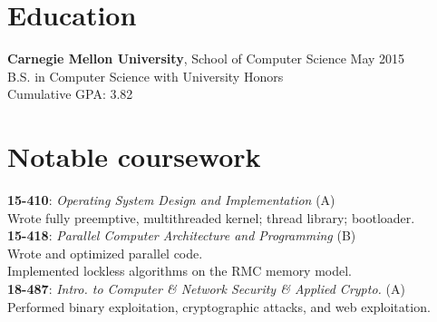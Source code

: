 \documentclass[margin]{res}
\newcommand{\course}[4]{ %
    \textbf{#1}: \textit{#2} (#4)\\
      #3
      \vspace{1em}
    \\}
\begin{document}

\address{
  \href{mailto:joshz@joshz.org}{joshz@joshz.org} \\
  (302) 468-7537
}
\address{  %
  \hfill \href{http://joshz.org}{http://joshz.org} \\
  \hfill
    \href{https://github.com/joshzimmerman}{https://github.com/joshzimmerman}
}

\begin{resume}

\section{Education}
  \textbf{Carnegie Mellon University}, School of Computer Science
    \hfill May 2015\\
  B.S. in Computer Science with University Honors\\
  Cumulative GPA: 3.82

\section{Notable coursework}
 \course{15-410}{Operating System Design and Implementation}
 {Wrote fully preemptive, multithreaded kernel; thread library; bootloader.}{A}
 \course{15-418}{Parallel Computer Architecture and Programming}
  {Wrote and optimized parallel code. \\
  Implemented lockless algorithms on the RMC memory model.}{B}
  \course{18-487}{Intro. to Computer \& Network Security \& Applied Crypto.}
 {Performed binary exploitation, cryptographic attacks, and web exploitation.}{A}
      \vspace{-2em}



\end{resume}
\end{document}
